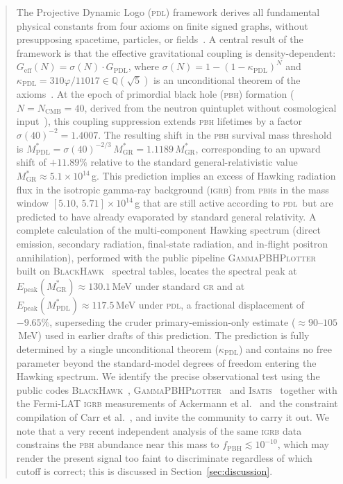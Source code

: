 \documentclass[12pt, a4paper]{article}
\theoremstyle{definition}
\newcommand{\PDL}{\textsc{pdl}}
\newcommand{\Geff}{G_{\mathrm{eff}}}
\newcommand{\GPDL}{G_{\mathrm{PDL}}}
\newcommand{\sigN}{\sigma(N)}
\newcommand{\kappaPDL}{\kappa_{\mathrm{PDL}}}
\newcommand{\MstarGR}{M^{*}_{\mathrm{GR}}}
\newcommand{\MstarPDL}{M^{*}_{\mathrm{PDL}}}
\newcommand{\NCMB}{N_{\mathrm{CMB}}}
\newcommand{\phigold}{\varphi}
\begin{document}
\begin{abstract}
The Projective Dynamic Logo (\PDL) framework derives all fundamental physical constants from four axioms on finite signed graphs, without presupposing spacetime, particles, or fields~\cite{D01,D21,D43v3}. A central result of the framework is that the effective gravitational coupling is density-dependent: $\Geff(N) = \sigN \cdot \GPDL$, where $\sigN = 1-(1-\kappaPDL)^{N}$ and $\kappaPDL = 310\phigold/11017 \in \mathbb{Q}(\sqrt{5})$ is an unconditional theorem of the axioms~\cite{D36,D42}. At the epoch of primordial black hole (\textsc{pbh}) formation ($N = \NCMB = 40$, derived from the neutron quintuplet without cosmological input~\cite{D27}), this coupling suppression extends \textsc{pbh} lifetimes by a factor $\sigma(40)^{-2} = 1.4007$. The resulting shift in the \textsc{pbh} survival mass threshold is $\MstarPDL = \sigma(40)^{-2/3}\,\MstarGR = 1.1189\,\MstarGR$, corresponding to an upward shift of $+11.89\%$ relative to the standard general-relativistic value $\MstarGR \approx 5.1 \times 10^{14}$\,g. This prediction implies an excess of Hawking radiation flux in the isotropic gamma-ray background (\textsc{igrb}) from \textsc{pbh}s in the mass window $[5.10,\,5.71]\times10^{14}$\,g that are still active according to \PDL\ but are predicted to have already evaporated by standard general relativity. A complete calculation of the multi-component Hawking spectrum (direct emission, secondary radiation, final-state radiation, and in-flight positron annihilation), performed with the public pipeline \textsc{GammaPBHPlotter}~\cite{Carlini2025} built on \textsc{BlackHawk}~\cite{BlackHawk} spectral tables, locates the spectral peak at $E_{\mathrm{peak}}(\MstarGR) \approx 130.1$\,MeV under standard \textsc{gr} and at $E_{\mathrm{peak}}(\MstarPDL) \approx 117.5$\,MeV under \PDL, a fractional displacement of $-9.65\%$, superseding the cruder primary-emission-only estimate ($\approx 90$--$105$\,MeV) used in earlier drafts of this prediction. The prediction is fully determined by a single unconditional theorem ($\kappaPDL$) and contains no free parameter beyond the standard-model degrees of freedom entering the Hawking spectrum. We identify the precise observational test using the public codes \textsc{BlackHawk}~\cite{BlackHawk}, \textsc{GammaPBHPlotter}~\cite{Carlini2025} and \textsc{Isatis}~\cite{Isatis} together with the Fermi-LAT \textsc{igrb} measurements of Ackermann et al.~\cite{FermiIGRB2015} and the constraint compilation of Carr et al.~\cite{Carr2021}, and invite the community to carry it out. We note that a very recent independent analysis of the same \textsc{igrb} data~\cite{Cholis2026} constrains the \textsc{pbh} abundance near this mass to $f_{\mathrm{PBH}}\lesssim10^{-10}$, which may render the present signal too faint to discriminate regardless of which cutoff is correct; this is discussed in Section~\ref{sec:discussion}.
\end{abstract}
\end{document}
